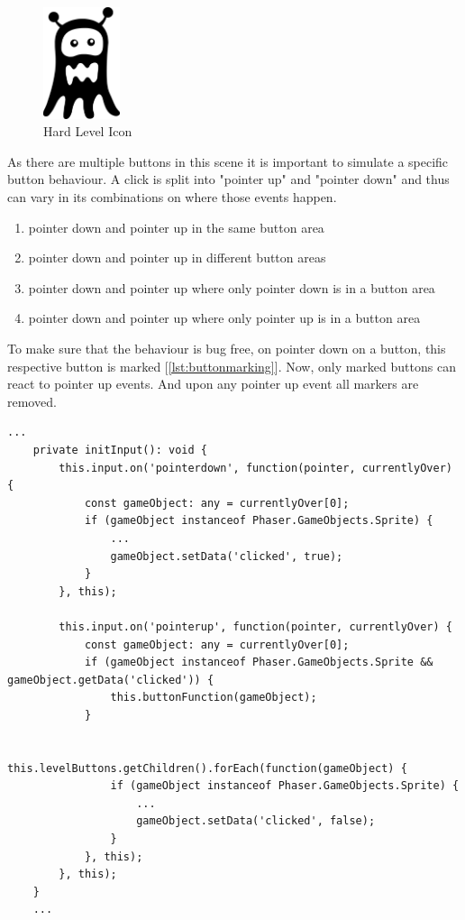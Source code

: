 \begin{figure}[H]
    \centering
    \includegraphics[width=0.2\textwidth]{figures/hardlevelicon}
    \caption{Hard Level Icon}
    \label{fig:hardlevelicon}
\end{figure}

As there are multiple buttons in this scene it is important to simulate a specific button behaviour.
A click is split into "pointer up" and "pointer down" and thus can vary in its combinations on where those events happen.

\begin{enumerate}
    \item pointer down and pointer up in the same button area
    \item pointer down and pointer up in different button areas
    \item pointer down and pointer up where only pointer down is in a button area
    \item pointer down and pointer up where only pointer up is in a button area
\end{enumerate}

To make sure that the behaviour is bug free, on pointer down on a button, this respective button is marked [\ref{lst:buttonmarking}].
Now, only marked buttons can react to pointer up events.
And upon any pointer up event all markers are removed.

\begin{lstlisting}[style=TypeScript, caption={Button marking (levelMenuScene.ts)}, label={lst:buttonmarking}]
    ...
    private initInput(): void {
        this.input.on('pointerdown', function(pointer, currentlyOver) {
            const gameObject: any = currentlyOver[0];
            if (gameObject instanceof Phaser.GameObjects.Sprite) {
                ...
                gameObject.setData('clicked', true);
            }
        }, this);

        this.input.on('pointerup', function(pointer, currentlyOver) {
            const gameObject: any = currentlyOver[0];
            if (gameObject instanceof Phaser.GameObjects.Sprite && gameObject.getData('clicked')) {
                this.buttonFunction(gameObject);
            }

            this.levelButtons.getChildren().forEach(function(gameObject) {
                if (gameObject instanceof Phaser.GameObjects.Sprite) {
                    ...
                    gameObject.setData('clicked', false);
                }
            }, this);
        }, this);
    }
    ...
\end{lstlisting}

